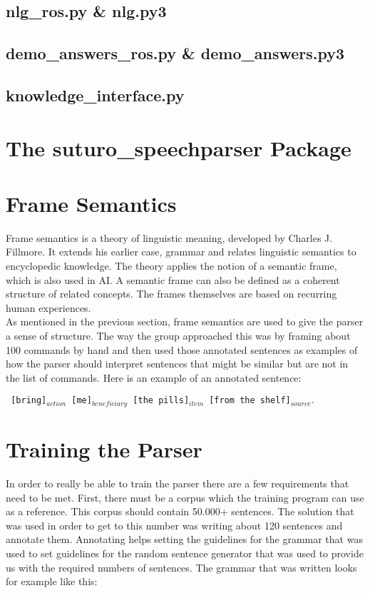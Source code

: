 \documentclass[main.tex]{subfiles}
\begin{document}
		\subsection{nlg\_ros.py \& nlg.py3}
		\subsection{demo\_answers\_ros.py \& demo\_answers.py3}
		\subsection{knowledge\_interface.py}
			
	\section{The suturo\_speechparser Package}
		
        
        


	
	\section{Frame Semantics}
	Frame semantics is a theory of linguistic meaning, developed by Charles J. Fillmore. It extends his earlier case, grammar and relates linguistic semantics to encyclopedic knowledge. The theory applies the notion of a semantic frame, which is also used in AI. A semantic frame can also be defined as a coherent structure of related concepts. The frames themselves are based on recurring human experiences.\\
	As mentioned in the previous section, frame semantics are used to give the parser a sense of structure. The way the group approached this was by framing about 100 commands by hand and then used those annotated sentences as examples of how the parser should interpret sentences that might be similar but are not in the list of commands. 
	Here is an example of an annotated sentence: 

	\texttt{ [bring]$_{action}$  [me]$_{beneficiary}$ [the pills]$_{item}$ [from the shelf]$_{source}.$}
	
	
	
	\section{Training the Parser}
	In order to really be able to train the parser there are a few requirements that need to be met. First, there must be a corpus which the training program can use as a reference. This corpus should contain 50.000+ sentences. The solution that was used in order to get to this number was writing about 120 sentences and annotate them. Annotating helps setting the guidelines for the grammar that was used to set guidelines for the random sentence generator that was used to provide us with the required numbers of sentences.
	The grammar that was written looks for example like this:
\end{document}
